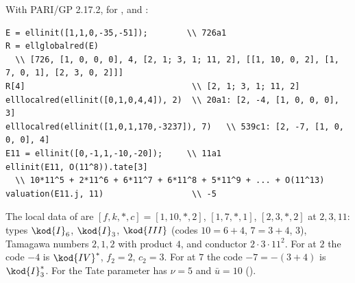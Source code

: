 \begin{example}\label{ex:reduction:pari-session}
With PARI/GP 2.17.2, for ,  and :
\begin{lstlisting}[language=GP]
E = ellinit([1,1,0,-35,-51]);        \\ 726a1
R = ellglobalred(E)
  \\ [726, [1, 0, 0, 0], 4, [2, 1; 3, 1; 11, 2], [[1, 10, 0, 2], [1, 7, 0, 1], [2, 3, 0, 2]]]
R[4]                                  \\ [2, 1; 3, 1; 11, 2]
elllocalred(ellinit([0,1,0,4,4]), 2)  \\ 20a1: [2, -4, [1, 0, 0, 0], 3]
elllocalred(ellinit([1,0,1,170,-3237]), 7)   \\ 539c1: [2, -7, [1, 0, 0, 0], 4]
E11 = ellinit([0,-1,1,-10,-20]);     \\ 11a1
ellinit(E11, O(11^8)).tate[3]
  \\ 10*11^5 + 2*11^6 + 6*11^7 + 6*11^8 + 5*11^9 + ... + O(11^13)
valuation(E11.j, 11)                  \\ -5
\end{lstlisting}
The local data of  are $[f,k,\ast,c]=[1,10,\ast,2]$, $[1,7,\ast,1]$, $[2,3,\ast,2]$ at $2,3,11$: types $\kod{I}_6$, $\kod{I}_3$, $\kod{III}$
(codes $10=6+4$, $7=3+4$, $3$), Tamagawa numbers $2,1,2$ with product $4$, and conductor $2\cdot3\cdot11^2$. For  at $2$ the code
$-4$ is $\kod{IV}^*$, $f_2=2$, $c_2=3$. For  at $7$ the code $-7=-(3+4)$ is $\kod{I}_3^*$. For  the Tate parameter has
$\nu=5$ and $\bar u=10$ ().
\end{example}

